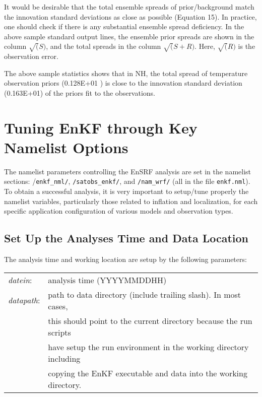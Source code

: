 It would be desirable that the total ensemble spreads of prior/background match the innovation standard deviations as close as possible (Equation 15). In practice, one should check if there is any substantial ensemble spread deficiency. In the above sample standard output lines, the ensemble prior spreads are shown in the column $\sqrt(S)$, and the total spreads in the column $\sqrt(S+R)$. Here, $\sqrt(R)$ is the observation error.

The above sample statistics shows that in NH, the total spread of temperature observation priors (0.128E+01  ) is close to the innovation standard deviation (0.163E+01) of the priors fit to the observations.

\section{Tuning EnKF through Key Namelist Options}

The namelist parameters controlling the EnSRF analysis are set in the namelist sections: /\verb|enkf_nml/|, \verb|/satobs_enkf/|, and \verb|/nam_wrf/| (all in the file \verb|enkf.nml|). To obtain a successful analysis, it is very important to setup/tune properly the namelist variables, particularly those related to inflation and localization, for each specific application configuration of various models and observation types.

 \subsection{Set Up the Analyses Time and Data Location}

 The analysis time and working location are setup by the following parameters:
\begin{table}[htbp]
\centering
\begin{tabular}{ll}

\textit{datein}: & analysis time (YYYYMMDDHH) \\

\textit{datapath}: & path to data directory (include trailing slash). In most cases,   \\
                 & this should  point to the current directory because the run scripts \\
                 & have setup the run environment in the working directory including \\ 
                 &  copying the EnKF executable and data into the working directory.  \\
               
\end{tabular}
\end{table}

